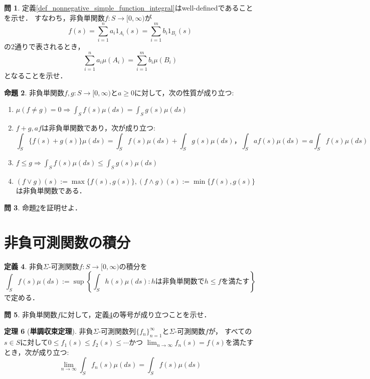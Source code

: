 \documentclass{jsreport}
\theoremstyle{definition}
\newtheorem{defi}{定義}[section]
\newtheorem{prop}[defi]{命題}
\newtheorem{thm}[defi]{定理}
\newtheorem{qst}[defi]{問}
\begin{document}
\begin{qst}\label{qst_simple_function_integral}
定義\ref{def_nonnegative_simple_function_integral}はwell-definedであることを示せ．
すなわち，非負単関数$f \colon S\to[0,\infty)$が
\[ f(s)=\sum_{i=1}^n a_i1_{A_i}(s)=\sum_{i=1}^m b_i1_{B_i}(s) \]
の2通りで表されるとき，
\[ \sum_{i=1}^n a_i\mu(A_i)=\sum_{i=1}^m b_i\mu(B_i) \]
となることを示せ．
\end{qst}

\begin{prop}\label{prop_properties_of_simple_function_integral}
非負単関数$f,g \colon S\to[0,\infty)$と$a\geq0$に対して，次の性質が成り立つ:
\begin{enumerate}
\item$\mu(f \neq g)=0\Rightarrow\displaystyle\int_S f(s)\mu(ds)=\int_S g(s)\mu(ds)$
\item$f+g, af$は非負単関数であり，次が成り立つ:
\[ \int_S \{f(s)+g(s)\}\mu(ds)=\int_S f(s)\mu(ds)+\int_S g(s)\mu(ds)，
\int_S af(s)\mu(ds)=a\int_S f(s)\mu(ds) \]
\item$f \leq g\Rightarrow\displaystyle\int_S f(s)\mu(ds)\leq\int_S g(s)\mu(ds)$
\item$(f \vee g)(s):=\max\{f(s),g(s)\}, (f \wedge g)(s):=\min\{f(s),g(s)\}$は非負単関数である．
\end{enumerate}
\end{prop}

\begin{qst}\label{qst_proof_of_properties_of_simple_function_integral}
命題\ref{prop_properties_of_simple_function_integral}を証明せよ．
\end{qst}

\section{非負可測関数の積分}

\begin{defi}\label{def_nonnegative_function_integral}
非負$\Sigma$-可測関数$f \colon S\to\mathbb[0,\infty)$の積分を
\[ \int_S f(s)\mu(ds):=\sup\left\{\int_Sh(s)\mu(ds):hは非負単関数でh \leq fを満たす\right\} \]
で定める．
\end{defi}

\begin{qst}\label{qst_nonnegative_function_integral_and_simple_function}
非負単関数$f$に対して，定義\ref{def_nonnegative_function_integral}の等号が成り立つことを示せ．
\end{qst}

\begin{thm}[\textbf{単調収束定理}]\label{monotone_convergence_theorem}
非負$\Sigma$-可測関数列$\{f_n\}_{n=1}^\infty$と$\Sigma$-可測関数$f$が，
すべての$s \in S$に対して$0 \leq f_1(s) \leq f_2(s) \leq\cdots$かつ
$\displaystyle\lim_{n\to\infty}f_n(s)=f(s)$を満たすとき，次が成り立つ:
\[ \lim_{n\to\infty}\int_S f_n(s)\mu(ds)=\int_S f(s)\mu(ds) \]
\end{thm}
\end{document}
